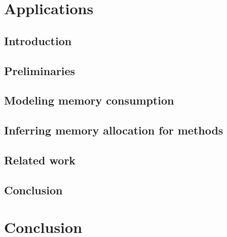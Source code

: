 \documentclass[book,10pt]{book}
\begin{document}
\chapter{Applications} 


\section{Introduction}


\section{Preliminaries}\label{sec:prelim}


\section{Modeling memory consumption}\label{sec:verif}


\section{Inferring memory allocation for methods}\label{sec:infer}


\section{Related work}\label{sec:rel}


\section{Conclusion}\label{sec:conc}




 
\chapter{Conclusion}

\appendix



\end{document}
